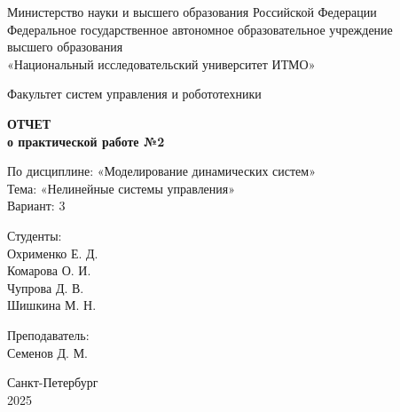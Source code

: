 \documentclass[a4paper,12pt]{article}
\begin{document}
	
	\begin{titlepage}
		\centering
		\vspace*{1cm}
		
		{\small
			Министерство науки и высшего образования Российской Федерации\\
			Федеральное государственное автономное образовательное учреждение\\
			высшего образования\\
			«Национальный исследовательский университет ИТМО»\\
		}
		
		\vspace{2cm}
		
		{\large
			Факультет систем управления и робототехники\\
		}
		
		\vspace{3cm}
		
		{\Huge\bfseries
			ОТЧЕТ\\
		}
		\vspace{0.5cm}
		{\LARGE\bfseries
			о практической работе №2\\
		}
		
		\vspace{1cm}
		
		{\Large
			По дисциплине: «Моделирование динамических систем»\\
			\vspace{0.5cm}
			Тема: «Нелинейные системы управления»\\
			\vspace{0.5cm}
			Вариант: 3\\
		}
		
		\vspace{3cm}
		
		\begin{minipage}{0.4\textwidth}
			\raggedright
			{\large
				Студенты:\\
			}
			Охрименко Е. Д.\\
			Комарова О. И.\\
			Чупрова Д. В.\\
			Шишкина М. Н.
		\end{minipage}
		\hfill
		\begin{minipage}{0.4\textwidth}
			\raggedleft
			{\large
				Преподаватель:\\
			}
			Семенов Д. М.\\
		\end{minipage}
		
		\vfill
		
		{\large
			Санкт-Петербург\\
			2025\\
		}
		
	\end{titlepage}
	
\end{document}
